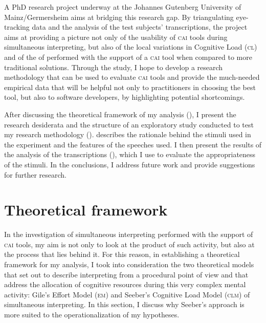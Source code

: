 \documentclass[output=paper]{langsci/langscibook}
\begin{document}
A PhD research project underway at the Johannes Gutenberg University of Mainz\slash Germersheim \citep{Prandi2016, Prandi2017a, Prandi2017b} aims at bridging this research gap. By triangulating eye-tracking data and the analysis of the test subjects’ transcriptions, the project aims at providing a picture not only of the usability of \textsc{cai} tools during simultaneous interpreting, but also of the local variations in Cognitive Load (\textsc{cl}) and of the  of  performed with the support of a \textsc{cai} tool when compared to more traditional  solutions. Through the study, I hope to develop a research methodology that can be used to evaluate \textsc{cai} tools and provide the much-needed empirical data that will be helpful not only to practitioners in choosing the best tool, but also to software developers, by highlighting potential shortcomings.

After discussing the theoretical framework of my analysis (), I present the research desiderata and the structure of an exploratory study conducted to test my research methodology ().  describes the rationale behind the stimuli used in the experiment and the features of the speeches used. I then present the results of the analysis of the transcriptions (), which I use to evaluate the appropriateness of the stimuli. In the conclusions, I address future work and provide suggestions for further research.

\section{Theoretical framework}\label{sec:prandi:2}
In the investigation of simultaneous interpreting performed with the support of \textsc{cai} tools, my aim is not only to look at the product of such activity, but also at the process that lies behind it. For this reason, in establishing a theoretical framework for my analysis, I took into consideration the two theoretical models that set out to describe interpreting from a procedural point of view and that address the allocation of cognitive resources during this very complex mental activity: Gile’s Effort Model (\textsc{em}) and Seeber’s Cognitive Load Model (\textsc{clm}) of simultaneous interpreting. In this section, I discuss why Seeber’s approach is more suited to the operationalization of my hypotheses.
\end{document}
